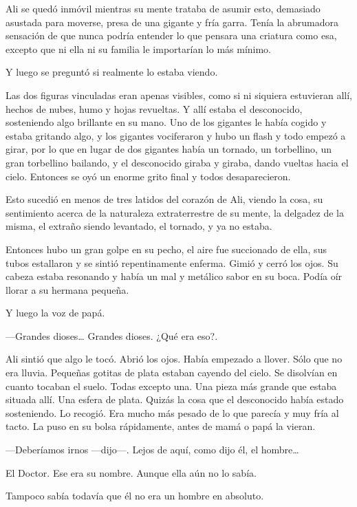 Ali se quedó inmóvil mientras su mente trataba de asumir esto, demasiado
asustada para moverse, presa de una gigante y fría garra. Tenía la
abrumadora sensación de que nunca podría entender lo que pensara una
criatura como esa, excepto que ni ella ni su familia le importarían lo
más mínimo.

Y luego se preguntó si realmente lo estaba viendo.

Las dos figuras vinculadas eran apenas visibles, como si ni siquiera
estuvieran allí, hechos de nubes, humo y hojas revueltas. Y allí estaba
el desconocido, sosteniendo algo brillante en su mano. Uno de los
gigantes le había cogido y estaba gritando algo, y los gigantes
vociferaron y hubo un flash y todo empezó a girar, por lo que en lugar
de dos gigantes había un tornado, un torbellino, un gran torbellino
bailando, y el desconocido giraba y giraba, dando vueltas hacia el
cielo. Entonces se oyó un enorme grito final y todos desaparecieron.

Esto sucedió en menos de tres latidos del corazón de Ali, viendo la
cosa, su sentimiento acerca de la naturaleza extraterrestre de su mente,
la delgadez de la misma, el extraño siendo levantado, el tornado, y ya
no estaba.

Entonces hubo un gran golpe en su pecho, el aire fue succionado de ella,
sus tubos estallaron y se sintió repentinamente enferma. Gimió y cerró
los ojos. Su cabeza estaba resonando y había un mal y metálico sabor en
su boca. Podía oír llorar a su hermana pequeña.

Y luego la voz de papá.

---Grandes dioses\ldots{} Grandes dioses. ¿Qué era eso?.

Ali sintió que algo le tocó. Abrió los ojos. Había empezado a llover.
Sólo que no era lluvia. Pequeñas gotitas de plata estaban cayendo del
cielo. Se disolvían en cuanto tocaban el suelo. Todas excepto una. Una
pieza más grande que estaba situada allí. Una esfera de plata. Quizás la
cosa que el desconocido había estado sosteniendo. Lo recogió. Era mucho
más pesado de lo que parecía y muy fría al tacto. La puso en su bolsa
rápidamente, antes de mamá o papá la vieran.

---Deberíamos irnos ---dijo---. Lejos de aquí, como dijo él, el
hombre\ldots{}

El Doctor. Ese era su nombre. Aunque ella aún no lo sabía.

Tampoco sabía todavía que él no era un hombre en absoluto.